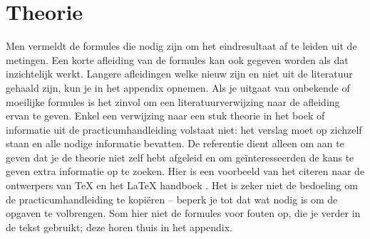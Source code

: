 \section{Theorie}
Men vermeldt de formules die nodig zijn om het eindresultaat af te leiden uit de metingen. 
Een korte afleiding van de formules kan ook gegeven worden als dat inzichtelijk werkt. 
Langere afleidingen welke nieuw zijn en niet uit de literatuur gehaald zijn, kun je in het appendix
opnemen. 
Als je uitgaat van onbekende of moeilijke formules is het zinvol om een literatuurverwijzing naar de afleiding ervan te geven.
Enkel een verwijzing naar een stuk theorie in het boek of informatie uit de practicumhandleiding volstaat niet: het verslag moet op zichzelf staan en alle nodige informatie bevatten.
De referentie dient alleen om aan te geven dat je de theorie niet zelf hebt afgeleid en om
geïnteresseerden de kans te geven extra informatie op te zoeken.
Hier is een voorbeeld van het citeren naar de ontwerpers van TeX \cite{latex2e} en het LaTeX handboek \cite{texbook}.
Het is zeker niet de bedoeling om de practicumhandleiding te kopiëren – beperk je tot dat wat
nodig is om de opgaven te volbrengen.
Som hier niet de formules voor fouten op, die je verder in de tekst gebruikt; deze horen thuis in
het appendix.
